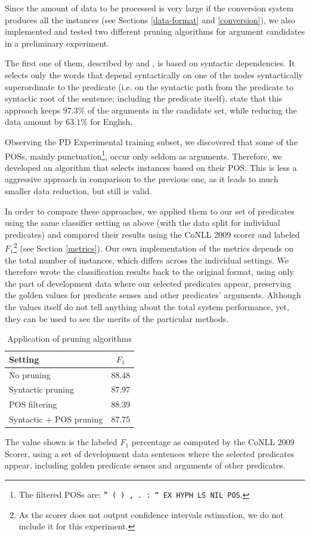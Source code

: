 \documentclass[12pt,notitlepage]{report}
\begin{document}
Since the amount of data to be processed is very large if the conversion system produces all the instances (see Sections \ref{data-format} and \ref{conversion}), we also implemented and tested two different pruning algorithms for argument candidates in a preliminary experiment. 

The first one of them, described by \citet{asahara09} and \citet{zhao09}, is based on syntactic dependencies. It selects only the words that depend syntactically on one of the nodes syntactically superordinate to the predicate (i.e. on the syntactic path from the predicate to syntactic root of the sentence; including the predicate itself). \citeauthor{asahara09} state that this approach keeps $97.3\%$ of the arguments in the candidate set, while reducing the data amount by $63.1\%$ for English.

Observing the PD Experimental training subset, we discovered that some of the POSs, mainly punctuation\footnote{The filtered POSs are: \texttt{'' ( ) , . : `` EX HYPH LS NIL POS}.}, occur only seldom as arguments. Therefore, we developed an algorithm that selects instances based on their POS. This is less a aggressive approach in comparison to the previous one, as it leads to much smaller data reduction, but still is valid. 

In order to compare these approaches, we applied them to our set of predicates using the same classifier setting as above (with the data split for individual predicates) and compared their results using the CoNLL 2009 scorer and labeled $F_1$\footnote{As the scorer does not output confidence intervals estimation, we do not include it for this experiment.} (see Section \ref{metrics}). Our own implementation of the metrics depends on the total number of instances, which differs across the individual settings. We therefore wrote the classification results back to the original format, using only the part of development data where our selected predicates appear, preserving the golden values for predicate senses and other predicates' arguments. Although the values itself do not tell anything about the total system performance, yet, they can be used to see the merits of the particular methods.

\begin{table}[htb]\label{tab:prune}
\caption{Application of pruning algorithms}\footnotesize
\begin{center}
\begin{tabular}{|l|c|}\hline
\bf Setting & $F_1$ \\\hline
No pruning & 88.48 \\
Syntactic pruning & 87.97 \\
POS filtering & 88.39 \\
Syntactic + POS pruning & 87.75 \\\hline
\end{tabular}
\end{center}
The value shown is the labeled $F_1$ percentage as computed by the CoNLL 2009 Scorer, using a set of development data sentences where the selected predicates appear, including golden predicate senses and arguments of other predicates.
\end{table}
\end{document}
